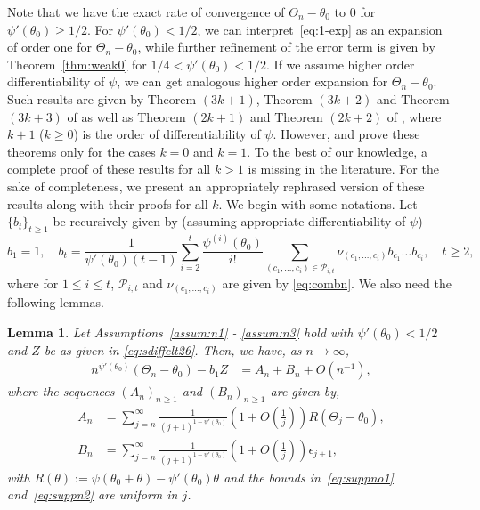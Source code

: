 \documentclass[12pt]{amsart}
\theoremstyle{plain}
\newtheorem{lemma}[theorem]{Lemma}
\theoremstyle{remark}
\numberwithin{equation}{section}
\begin{document}
Note that we have the exact rate of convergence of $\Theta_n - \theta_0$ to $0$ for $\psi'(\theta_0) \ge 1/2$. For $\psi'(\theta_0)<1/2$, we can interpret~\eqref{eq:1-exp} as an expansion of order one for $\Theta_n - \theta_0$, while further refinement of the error term is given by Theorem~\ref{thm:weak0} for $1/4 < \psi'(\theta_0) < 1/2$. If we assume higher order differentiability of $\psi$, we can get analogous higher order expansion for $\Theta_n - \theta_0$. Such results are given by Theorem $(3k+1)$, Theorem $(3k+2)$ and Theorem $(3k+3)$ of \cite{major1973limit} as well as Theorem $(2k+1)$ and Theorem $(2k+2)$ of \cite{krasulina1996estimate}, where $k+1$ ($k \geq 0$) is the order of differentiability of $\psi$. However, \cite{krasulina1996estimate} and \cite{major1973limit} prove these theorems only for the cases $k = 0$ and $k = 1$.
To the best of our knowledge, a complete proof of these results for all $k > 1$ is missing in the literature. For the sake of completeness, we present an appropriately rephrased version of these results along with their proofs for all $k$. We begin with some notations. 
Let %
$\{b_t\}_{t\geq 1}$ be recursively given by (assuming appropriate differentiability of $\psi$)
\begin{equation} \label{eq: def b}
b_1 = 1, \quad b_t = \frac{1}{\psi'(\theta_0)(t-1)}\sum_{i=2}^{t}\frac{\psi^{(i)}(\theta_0)}{i!}\sum_{(c_1, \ldots, c_i) \in \mathcal{P}_{i,t}}\nu_{(c_1, \ldots, c_i)}b_{c_1}\ldots b_{c_i}, \quad t \geq 2,
\end{equation}
where for $1 \leq i \leq t$, $\mathcal{P}_{i,t}$ and $\nu_{(c_1, \ldots, c_i)}$ are given by \eqref{eq:combn}.
We also need the following lemmas.
\begin{lemma} Let Assumptions~\ref{assum:n1} - \ref{assum:n3} hold with $\psi'(\theta_0) < 1/2$ and $Z$ be as given in \eqref{eq:sdiffclt26}. Then, we have, as $n\to\infty$,
    \begin{align}\label{eq:supp1}
    n^{\psi'(\theta_0)}\left(\Theta_n - \theta_0\right) - b_1 Z &= A_n + B_n + O\left(n^{-1}\right),
\end{align}
where the sequences $(A_n)_{n \geq 1}$ and $(B_n)_{n \geq 1}$ are given by,
\begin{align}
    A_n &= \sum_{j=n}^{\infty}\frac{1}{{(j+1)}^{1-\psi'(\theta_0)}}\left(1+O\left(\frac{1}{j}\right)\right)R(\Theta_j - \theta_0),  \label{eq:suppno1} \\ B_n &= \sum_{j=n}^{\infty}\frac{1}{{(j+1)}^{1-\psi'(\theta_0)}}\left(1+O\left(\frac{1}{j}\right)\right)\epsilon_{j+1},\label{eq:suppn2}
\end{align}
with {$R(\theta) := \psi(\theta_0 +\theta) - \psi'(\theta_0)\theta$} and the bounds in~\eqref{eq:suppno1} and~\eqref{eq:suppn2} are uniform in $j$.
\end{lemma}
\end{document}
